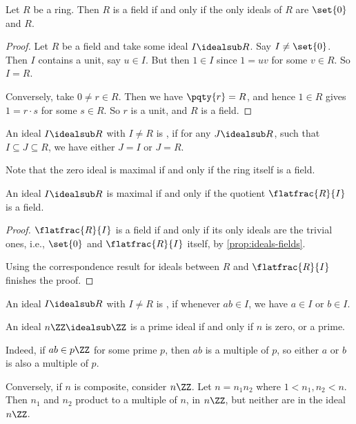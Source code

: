 \begin{proposition}
    \label{prop:ideals-fields}%
    Let \(R\) be a ring. Then \(R\) is a field if and only if the only ideals of \(R\) are \(\set{0}\) and \(R\).
\end{proposition}

\begin{proof}
    Let \(R\) be a field and take some ideal \(I \idealsub R\). Say \(I \neq \set{0}\). Then \(I\) contains a unit, say \(u \in I\). But then \(1 \in I\) since \(1 = uv\) for some \(v \in R\). So \(I = R\).

    Conversely, take \(0 \neq r \in R\). Then we have \(\pqty{r} = R\), and hence \(1 \in R\) gives \(1 = r \cdot s\) for some \(s \in R\). So \(r\) is a unit, and \(R\) is a field.
\end{proof}

\begin{definition}
    \label{def:maximal-ideal}%
    An ideal \(I \idealsub R\) with \(I \neq R\) is , if for any \(J \idealsub R\), such that \(I \subseteq J \subseteq R\), we have either \(J = I\) or \(J = R\).
\end{definition}

Note that the zero ideal is maximal if and only if the ring itself is a field.

\begin{proposition}
    \label{prop:ideal-maximal-quotient-field}%
    An ideal \(I \idealsub R\) is maximal if and only if the quotient \(\flatfrac{R}{I}\) is a field.
\end{proposition}

\begin{proof}
    \(\flatfrac{R}{I}\) is a field if and only if its only ideals are the trivial ones, i.e., \(\set{0}\) and \(\flatfrac{R}{I}\) itself, by \autoref{prop:ideals-fields}.

    Using the correspondence result for ideals between \(R\) and \(\flatfrac{R}{I}\) finishes the proof.
\end{proof}

\begin{definition}
    \label{def:prime-ideal}%
    An ideal \(I \idealsub R\) with \(I \neq R\) is , if whenever \(ab \in I\), we have \(a \in I\) or \(b \in I\).
\end{definition}

\begin{example}
    \label{ex:prime-ideals-of-z}%
    An ideal \(n\ZZ \idealsub \ZZ\) is a prime ideal if and only if \(n\) is zero, or a prime.
    
    Indeed, if \(ab \in p\ZZ\) for some prime \(p\), then \(ab\) is a multiple of \(p\), so either \(a\) or \(b\) is also a multiple of \(p\).

    Conversely, if \(n\) is composite, consider \(n \ZZ\). Let \(n = n_1 n_2\) where \(1 < n_1, n_2 < n\). Then \(n_1\) and \(n_2\) product to a multiple of \(n\), in \(n \ZZ\), but neither are in the ideal \(n \ZZ\).
\end{example}


